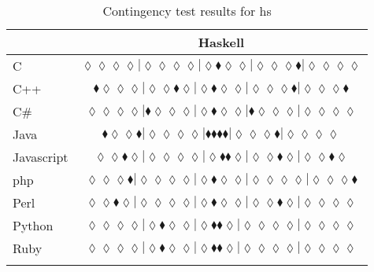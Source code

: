 \begin{table*}
\centering
\begin{tabular}{l c}
& Haskell \\
\hline

C & $\scriptscriptstyle\lozenge\lozenge\lozenge\lozenge|\lozenge\lozenge\lozenge\lozenge|\lozenge\blacklozenge\lozenge\lozenge|\lozenge\lozenge\lozenge\blacklozenge|\lozenge\lozenge\lozenge\lozenge$ \\
C++ & $\scriptscriptstyle\blacklozenge\lozenge\lozenge\lozenge|\lozenge\lozenge\blacklozenge\lozenge|\lozenge\blacklozenge\lozenge\lozenge|\lozenge\lozenge\lozenge\blacklozenge|\lozenge\lozenge\lozenge\blacklozenge$ \\
C\# & $\scriptscriptstyle\lozenge\lozenge\lozenge\lozenge|\blacklozenge\lozenge\lozenge\lozenge|\lozenge\blacklozenge\lozenge\lozenge|\blacklozenge\lozenge\lozenge\lozenge|\lozenge\lozenge\lozenge\lozenge$ \\
Java & $\scriptscriptstyle\blacklozenge\lozenge\lozenge\blacklozenge|\lozenge\lozenge\lozenge\lozenge|\blacklozenge\blacklozenge\blacklozenge\blacklozenge|\lozenge\lozenge\lozenge\blacklozenge|\lozenge\lozenge\lozenge\lozenge$ \\
Javascript & $\scriptscriptstyle\lozenge\lozenge\blacklozenge\lozenge|\lozenge\lozenge\lozenge\lozenge|\lozenge\blacklozenge\blacklozenge\lozenge|\lozenge\lozenge\blacklozenge\lozenge|\lozenge\lozenge\blacklozenge\lozenge$ \\
{\sc php} & $\scriptscriptstyle\lozenge\lozenge\lozenge\blacklozenge|\lozenge\lozenge\lozenge\lozenge|\lozenge\blacklozenge\lozenge\lozenge|\lozenge\lozenge\lozenge\lozenge|\lozenge\lozenge\lozenge\blacklozenge$ \\
Perl & $\scriptscriptstyle\lozenge\lozenge\blacklozenge\lozenge|\lozenge\lozenge\lozenge\lozenge|\lozenge\blacklozenge\lozenge\lozenge|\lozenge\lozenge\blacklozenge\lozenge|\lozenge\lozenge\lozenge\lozenge$ \\
Python & $\scriptscriptstyle\lozenge\lozenge\lozenge\lozenge|\lozenge\blacklozenge\lozenge\lozenge|\lozenge\blacklozenge\blacklozenge\lozenge|\lozenge\lozenge\lozenge\lozenge|\lozenge\lozenge\lozenge\lozenge$ \\
Ruby & $\scriptscriptstyle\lozenge\lozenge\lozenge\lozenge|\lozenge\blacklozenge\lozenge\lozenge|\lozenge\blacklozenge\blacklozenge\lozenge|\lozenge\lozenge\lozenge\lozenge|\lozenge\lozenge\lozenge\lozenge$ \\

\hline
& \\
\end{tabular}
\caption{Contingency test results for hs}
\label{tbl:contingency-test-results-hs}
\end{table*}


